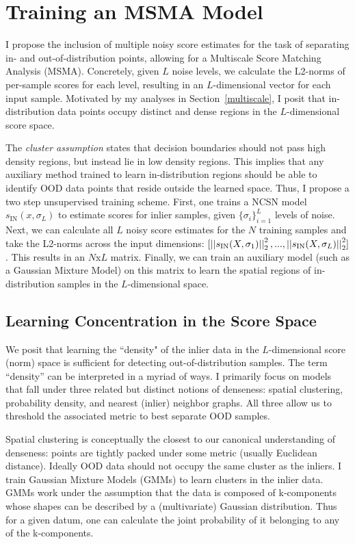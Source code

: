 \section{Training an MSMA Model}

I propose the inclusion of multiple noisy score estimates for the task of separating in- and out-of-distribution points, allowing for a Multiscale Score Matching Analysis (MSMA). Concretely, given $L$ noise levels, we calculate the L2-norms of per-sample scores for each level, resulting in an $L$-dimensional vector for each input sample. Motivated by my analyses in Section~\ref{multiscale}, I posit that in-distribution data points occupy distinct and dense regions in the $L$-dimensional score space.

The \textit{cluster assumption} states that decision boundaries should not pass high density regions, but instead lie in low density regions. This implies that any auxiliary method trained to learn in-distribution regions should be able to identify OOD data points that reside outside the learned space. Thus, I propose a two step unsupervised training scheme. First, one trains a NCSN model $s_{\text{IN}}(x, \sigma_L)$ to estimate scores for inlier samples, given $\{\sigma_i\}_{i=1}^L$ levels of noise. Next, we can calculate all $L$ noisy score estimates for the $N$ training samples and take the L2-norms across the input dimensions: $[\left|\left| {  s_{\text{IN}} (X, \sigma_1) } \right|\right|_2^2, ... , \left|\left| {  s_{\text{IN}} (X, \sigma_L) } \right|\right|_2^2 ]$. This results in an $N$x$L$ matrix. Finally, we can train an auxiliary model (such as a Gaussian Mixture Model) on this matrix to learn the spatial regions of in-distribution samples in the $L$-dimensional space.

\subsection*{Learning Concentration in the Score Space}

We posit that learning the ``density" of the inlier data in the $L$-dimensional score (norm) space is sufficient for detecting out-of-distribution samples. The term “density” can be interpreted in a myriad of ways. I primarily focus on models that fall under three related but distinct notions of denseness: spatial clustering, probability density, and nearest (inlier) neighbor graphs. All three allow us to threshold the associated metric to best separate OOD samples.

Spatial clustering is conceptually the closest to our canonical understanding of denseness: points are tightly packed under some metric (usually Euclidean distance). Ideally OOD data should not occupy the same cluster as the inliers. I train Gaussian Mixture Models (GMMs) to learn clusters in the inlier data. GMMs work under the assumption that the data is composed of k-components whose shapes can be described by a (multivariate) Gaussian distribution. Thus for a given datum, one can calculate the joint probability of it belonging to any of the k-components.

